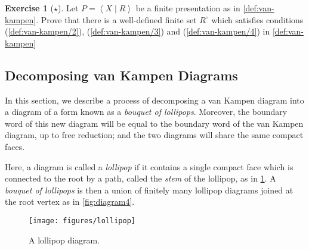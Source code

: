 \documentclass[11pt,a4paper,reqno]{amsart}
\theoremstyle{plain}
\theoremstyle{definition}
\theoremstyle{definition}
\newtheorem{exercise}[theorem]{Exercise}
\newcommand\exerciseLevelEasy{$\star$}
\begin{document}
\begin{exercise}[\exerciseLevelEasy]
	Let $P = \left\langle X\mid R\right\rangle$ be a finite presentation as in \cref{def:van-kampen}.
	Prove that there is a well-defined finite set $R^\circ$ which satisfies conditions (\ref{def:van-kampen/2}), (\ref{def:van-kampen/3}) and (\ref{def:van-kampen/4}) in \cref{def:van-kampen}
\end{exercise}

\subsection{Decomposing van Kampen Diagrams}\label{sec:van-kampen-decomp}

In this section, we describe a process of decomposing a van Kampen diagram into a diagram of a form known as a \emph{bouquet of lollipops}.
Moreover, the boundary word of this new diagram will be equal to the boundary word of the van Kampen diagram, up to free reduction; and the two diagrams will share the same compact faces.

Here, a diagram is called a \emph{lollipop} if it contains a single compact face which is connected to the root by a path, called the \emph{stem} of the lollipop, as in \cref{fig:lollipop}.
A \emph{bouquet of lollipops} is then a union of finitely many lollipop diagrams joined at the root vertex as in \cref{fig:diagram4}.

\begin{figure}[ht!]
	\centering
	\texttt{[image: figures/lollipop]}
	\caption{A lollipop diagram.}\label{fig:lollipop}
\end{figure}
\end{document}
